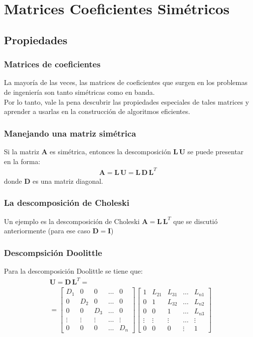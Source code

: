 \documentclass[12pt]{beamer}
\begin{document}
\section{Matrices Coeficientes Simétricos}
\subsection{Propiedades}

\begin{frame}
\frametitle{Matrices de coeficientes}
La mayoría de las veces, las matrices de coeficientes que surgen en los problemas de ingeniería son tanto simétricas como en banda.
\\
\bigskip
\pause
Por lo tanto, vale la pena descubrir las propiedades especiales de tales matrices y aprender a usarlas en la construcción de algoritmos eficientes.
\end{frame}
\begin{frame}
\frametitle{Manejando una matriz simétrica}
Si la matriz $\textbf{A}$ es simétrica, \pause entonces la descomposición $\mathbf{L \, U}$ se puede presentar en la forma:
\pause
\begin{align}
\mathbf{A} = \mathbf{L \, U} = \mathbf{L \, D} \, \mathbf{L}^{T}
\label{eq:ecuacion_02_23} 
\end{align}
donde $\mathbf{D}$ es una matriz diagonal.
\end{frame}
\begin{frame}
\frametitle{La descomposición de Choleski}
Un ejemplo es la descomposición de Choleski $\mathbf{A} = \mathbf{L \, L}^{T}$ que se discutió anteriormente (para ese caso $\mathbf{D} = \mathbf{I}$)
\end{frame}
\begin{frame}
\frametitle{Descompsición Doolittle}
Para la descomposición Doolittle se tiene que:
\pause
\renewcommand{\arraystretch}{0.8}
\begin{align*}
&\mathbf{U} = \mathbf{D \, L}^{T} = \\
&=
\begin{bmatrix}
D_{1} & 0 & 0 & \ldots & 0 \\
0 & D_{2} & 0 & \ldots & 0 \\
0 & 0 & D_{3} & \ldots & 0 \\
\vdots & \vdots & \vdots & \ldots & \vdots \\
0 & 0 & 0 & \ldots & D_{n}
\end{bmatrix}
\begin{bmatrix}
1 & L_{21} & L_{31} & \ldots & L_{n1} \\
0 & 1 & L_{32} & \ldots & L_{n2} \\
0 & 0 & 1 & \ldots & L_{n3} \\
\vdots & \vdots & \vdots & \ldots & \vdots \\
0 & 0 & 0 & \vdots & 1
\end{bmatrix}
\end{align*}
\end{frame}
\end{document}
